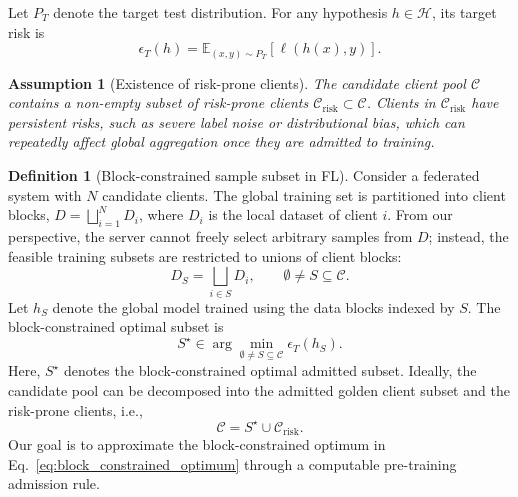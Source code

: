 \documentclass[conference]{IEEEtran}
\newtheorem{assumption}{Assumption}
\theoremstyle{definition}
\newtheorem{definition}{Definition}
\theoremstyle{remark}
\begin{document}
Let $P_T$ denote the target test distribution.
For any hypothesis $h\in\mathcal H$, its target risk is
\begin{equation}
\label{eq:target_risk_def}
\epsilon_T(h)
=
\mathbb E_{(x,y)\sim P_T}
\left[
\ell(h(x),y)
\right].
\end{equation}
\begin{assumption}[Existence of risk-prone clients]
\label{assump:risk_prone_clients}
The candidate client pool $\mathcal{C}$ contains a non-empty subset of risk-prone clients 
$\mathcal{C}_{\mathrm{risk}}\subset \mathcal{C}$. 
Clients in $\mathcal{C}_{\mathrm{risk}}$ have persistent risks, such as severe label noise or distributional bias, which can repeatedly affect global aggregation once they are admitted to training.
\end{assumption}

\begin{definition}[Block-constrained sample subset in FL]
\label{def:block_constrained_subset}
Consider a federated system with $N$ candidate clients.
The global training set is partitioned into client blocks,
$D=\bigsqcup_{i=1}^{N}D_i$, where $D_i$ is the local dataset of client $i$.
From our perspective, the server cannot freely select arbitrary samples from $D$; instead, the feasible training subsets are restricted to unions of client blocks:
\[
D_S=\bigsqcup_{i\in S}D_i,
\qquad
\emptyset\neq S\subseteq  \mathcal{C}.
\]
Let $h_S$ denote the global model trained using the data blocks indexed by $S$.
The block-constrained optimal subset is
\begin{equation}
\label{eq:block_constrained_optimum}
S^\star
\in
\arg\min_{\emptyset\neq S\subseteq \mathcal{C}}
\epsilon_T(h_S).
\end{equation}
Here, $S^\star$ denotes the block-constrained optimal admitted subset. 
Ideally, the candidate pool can be decomposed into the admitted golden client subset and the risk-prone clients, i.e.,
\[
\mathcal{C}=S^\star\cup\mathcal{C}_{\mathrm{risk}}.
\]
Our goal is to approximate the block-constrained optimum in Eq.~\eqref{eq:block_constrained_optimum} through a computable pre-training admission rule.
\end{definition}
\end{document}
